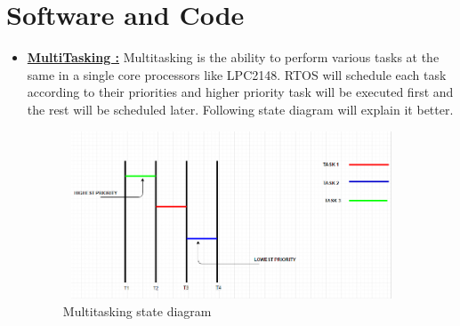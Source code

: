 \documentclass[a4paper,12pt,oneside]{book}
\begin{document}
\section{Software and Code}
\begin{itemize}
  \item \textbf{\href{https://github.com/eYSIP-2016/RTOS_LPC2148/tree/master/Multitasking}{MultiTasking :}
}Multitasking is the ability to perform various tasks at the same in a single core processors like LPC2148. RTOS will schedule each task according to their priorities and higher priority task will be executed first and the rest will be scheduled later. Following state diagram will explain it better.
\begin{figure}[h]
\centering
\includegraphics[width=10cm,height=5cm]{multitasking_states.PNG}
\caption{Multitasking state diagram}
\end{figure}


\end{itemize}
\end{document}
